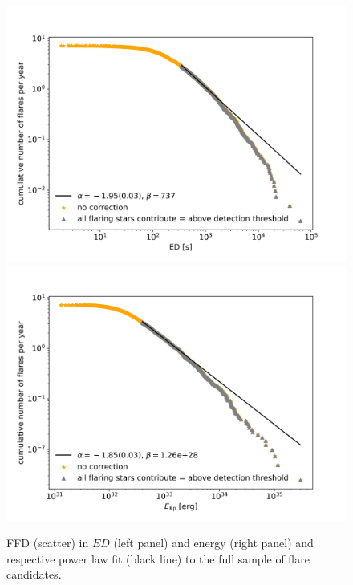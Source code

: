 \documentclass{aa}
\begin{document}
\begin{figure}
    \centering
    \includegraphics[width=0.49\hsize]{pics/FFDs/full_sample_ffd_ED.png}
    \hspace{.01cm}
    \includegraphics[width=0.49\hsize]{pics/FFDs/full_sample_ffd_energy.png}
    \caption{FFD (scatter) in $ED$ (left panel) and energy (right panel) and respective power law fit (black line) to the full sample of flare candidates.}          	
    \label{powerlawfit_full}
\end{figure}
\end{document}

